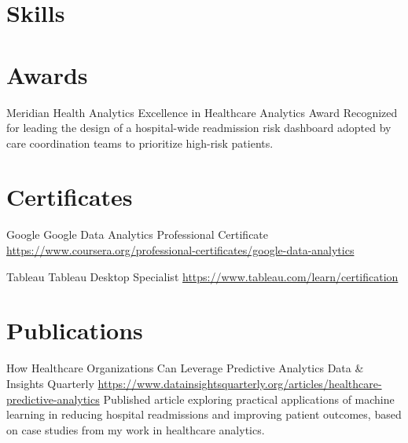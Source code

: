 \documentclass[a4paper, serif, 10pt]{moderncv}
\begin{document}
\section{Skills}

\section{Awards}

        {Meridian Health Analytics}
        {Excellence in Healthcare Analytics Award}
        {}
        {}
        {Recognized for leading the design of a hospital-wide readmission risk dashboard adopted by care coordination teams to prioritize high-risk patients.}
\section{Certificates}

        {Google}
        {Google Data Analytics Professional Certificate}
        {\url{https://www.coursera.org/professional-certificates/google-data-analytics}}
        {}
        {}

        {Tableau}
        {Tableau Desktop Specialist}
        {\url{https://www.tableau.com/learn/certification}}
        {}
        {}
\section{Publications}

        {How Healthcare Organizations Can Leverage Predictive Analytics}
        {Data \& Insights Quarterly}
        {\url{https://www.datainsightsquarterly.org/articles/healthcare-predictive-analytics}}
        {}
        {Published article exploring practical applications of machine learning in reducing hospital readmissions and improving patient outcomes, based on case studies from my work in healthcare analytics.}
\end{document}
